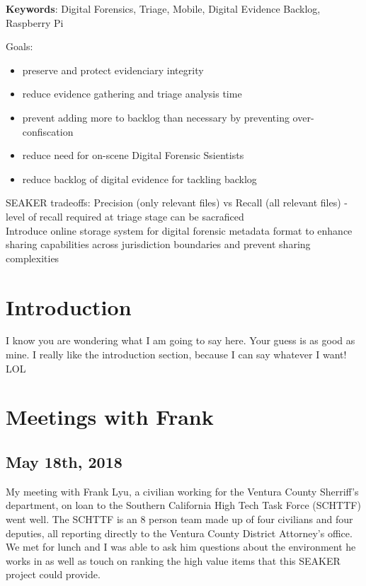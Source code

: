 \documentclass[12pt]{article}
\begin{document}
\textbf{Keywords}: Digital Forensics, Triage, Mobile, Digital Evidence Backlog, Raspberry Pi

Goals: \\
\begin{itemize}
  \item preserve and protect evidenciary integrity
  \item reduce evidence gathering and triage analysis time
  \item prevent adding more to backlog than necessary by preventing over-confiscation
  \item reduce need for on-scene Digital Forensic Ssientists
  \item reduce backlog of digital evidence for tackling backlog
\end{itemize}

SEAKER tradeoffs: Precision (only relevant files) vs Recall (all relevant files)
- level of recall required at triage stage can be sacraficed\\

Introduce online storage system for digital forensic metadata format to enhance sharing capabilities across
jurisdiction boundaries and prevent sharing complexities

\section{Introduction}
\label{sect-intro}
\vspace{0.5 cm}

I know you are wondering what I am going to say here.  Your guess is as good as mine.  I really like
the introduction section, because I can say whatever I want! LOL\\

\section{Meetings with Frank}
\label{sect-frank}
\vspace{0.5 cm}
\subsection{May 18th, 2018}

My meeting with Frank Lyu, a civilian working for the Ventura County Sherriff's department, on loan to
the Southern California High Tech Task Force (SCHTTF) went well.  The SCHTTF is an 8 person team made up of
four civilians and four deputies, all reporting directly to the Ventura County District Attorney's office.
We met for lunch and I was able to ask him questions about the environment he works in as well as touch on
ranking the high value items that this SEAKER project could provide.\\
\end{document}
